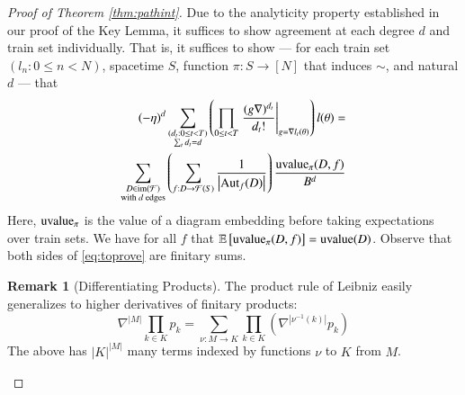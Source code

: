 \documentclass[openany, notitlepage, justified]{tufte-book}
\theoremstyle{plain}
\theoremstyle{definition}
\newtheorem{rmk}{Remark}
\newcommand{\wrap}[1]{\left(#1\right)}
\newcommand{\wabs}[1]{\left|#1\right|}
\newcommand{\Free}{\mathcal{F}}
\newcommand{\Aut}{\text{\textnormal{Aut}}}
\newcommand{\image}{\text{\textnormal{im}}}
\newcommand{\uvalue}{\text{\textnormal{uvalue}}}
\newcommand{\expct}[1]{\mathbb{E}\left[#1\right]}
\begin{document}
        \begin{proof}[Proof of Theorem \ref{thm:pathint}]
            Due to the analyticity property established in our proof of the
            Key Lemma, it suffices to show agreement at each degree $d$ and
            train set individually.  That is, it suffices to show --- for
            each train set $(l_n: 0\leq n<N)$, spacetime $S$, function $\pi:
            S\to [N]$ that induces $\sim$, and natural $d$ --- that
            \begin{align} \label{eq:toprove}
                (-\eta)^d
                \sum_{\substack{
                    (d_t: 0\leq t<T) \\
                    \sum_t d_t = d
                }}
                \wrap{
                    \prod_{0 \leq t < T} \left.
                        \frac{(g \nabla)^{d_t}}{d_t!}
                    \right|_{g=\nabla l_t(\theta)}
                } l (\theta)
                = \nonumber \\
                \sum_{\substack{
                    D \in \image(\Free) \\
                    \textnormal{with $d$ edges}
                }}
                \wrap{
                    \sum_{f: D\to\Free(S)}
                    \frac{1}{\wabs{\Aut_f(D)}}
                }
                \frac{\uvalue_\pi(D, f)}{B^{d}}
            \end{align}
            Here, $\uvalue_\pi$ is the value of a diagram embedding before
            taking expectations over train sets.  We have for all $f$ that
            $\expct{\uvalue_\pi(D, f)} = \uvalue(D)$.
            Observe that both sides of \ref{eq:toprove} are finitary sums.

            \begin{rmk}[Differentiating Products] \label{rmk:leibniz}
                The product rule of Leibniz easily generalizes to higher
                derivatives of finitary products:
                $$
                    \nabla^{\wabs{M}} \prod_{k \in K} p_k
                    = 
                    \sum_{\nu:M\to K} \prod_{k\in K} \wrap{
                        \nabla^{\wabs{\nu^{-1}(k)}} p_k
                    }
                $$
                The above has $\wabs{K}^{\wabs{M}}$ many terms indexed by
                functions $\nu$ to $K$ from $M$.
            \end{rmk}


\end{proof}
\end{document}
